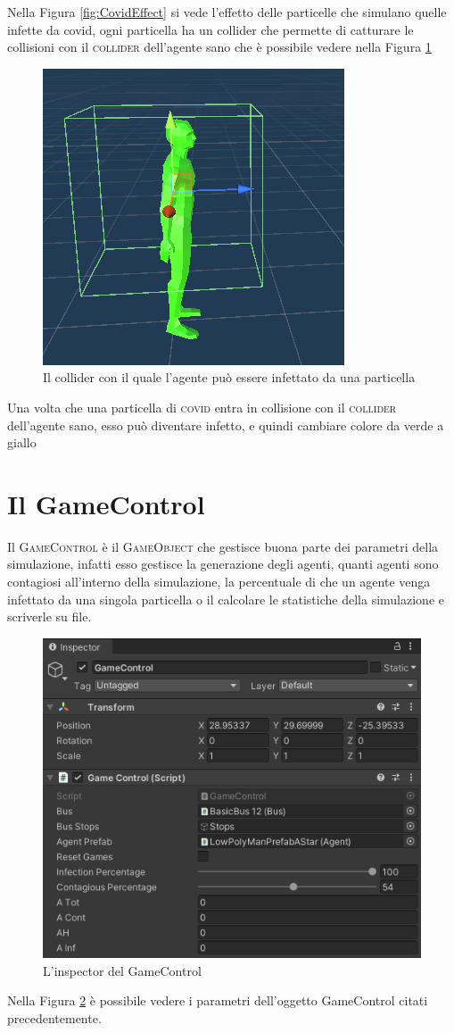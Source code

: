 \documentclass[12pt, openany]{book}
\begin{document}
 	Nella Figura \ref{fig:CovidEffect} si vede l'effetto delle particelle che simulano quelle infette da covid, ogni particella ha un collider che permette di catturare le collisioni con il \textsc{collider} dell'agente sano che è possibile vedere nella Figura \ref{fig:ColliderCovid}
 	\begin{figure}[H]
 		\centering
 		\includegraphics[width=0.5\linewidth]{"Immagini/ColliderCovid.png"}
 		\caption{Il collider con il quale l'agente può essere infettato da una particella}
 		\label{fig:ColliderCovid}
 	\end{figure}
 	Una volta che una particella di \textsc{covid} entra in collisione con il \textsc{collider} dell'agente sano, esso può diventare infetto, e quindi cambiare colore da verde a giallo
 	\section{Il GameControl}
 		Il \textsc{GameControl} è il \textsc{GameObject} che gestisce buona parte dei parametri della simulazione,  infatti esso gestisce la generazione degli agenti, quanti agenti sono contagiosi all'interno della simulazione, la percentuale di che un agente venga infettato da una singola particella o il calcolare le statistiche della simulazione e scriverle su file.
 		\begin{figure}[H]
 			\centering
 			\includegraphics[width=1\linewidth]{"Immagini/GameControl.png"}
 			\caption{L'inspector del GameControl}
 			\label{fig:GameControl}
 		\end{figure}
 		Nella Figura \ref{fig:GameControl} è possibile vedere i parametri dell'oggetto GameControl citati precedentemente.
\end{document}
